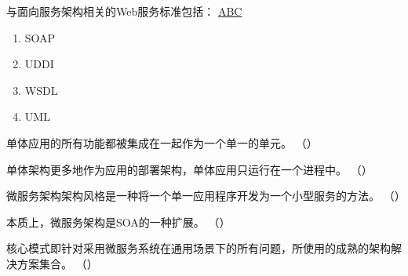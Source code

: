 \begin{problem}
	与面向服务架构相关的Web服务标准包括：
	\uline{ABC}    
    \vspace{-0.8em}
    \begin{multicols}{4}
        \begin{enumerate}[label=\Alph*.]
            \item SOAP
            \item UDDI
            \item WSDL
            \item UML
        \end{enumerate}
    \end{multicols}
    \vspace{-1em}
\end{problem}



\begin{problem}
	单体应用的所有功能都被集成在一起作为一个单一的单元。
    \hfill （）
\end{problem}



\begin{problem}
	单体架构更多地作为应用的部署架构，单体应用只运行在一个进程中。
    \hfill （）
\end{problem}



\begin{problem}
	微服务架构架构风格是一种将一个单一应用程序开发为一个小型服务的方法。
    \hfill （）
\end{problem}



\begin{problem}
	本质上，微服务架构是SOA的一种扩展。
    \hfill （）
\end{problem}



\begin{problem}
	核心模式即针对采用微服务系统在通用场景下的所有问题，所使用的成熟的架构解决方案集合。
    \hfill （）
\end{problem}
